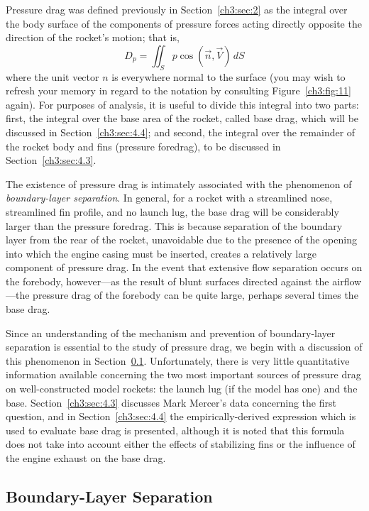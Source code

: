 Pressure drag was defined previously in Section~\ref{ch3:sec:2} as the
integral over the body surface of the components of pressure forces acting
directly opposite the direction of the rocket's motion; that is,
\begin{equation}\label{ch3:eq:109}
D_p = \iint_{S} p\cos(\vec{n},\vec{V})\,dS
\end{equation}
where the unit vector $n$ is everywhere normal to the surface (you may wish to
refresh your memory in regard to the notation by consulting
Figure~\ref{ch3:fig:11} again). For purposes of analysis, it is useful to
divide this integral into two parts: first, the integral over the base area of
the rocket, called base drag, which will be discussed in
Section~\ref{ch3:sec:4.4}; and second, the integral over the remainder of the
rocket body and fins (pressure foredrag), to be discussed in
Section~\ref{ch3:sec:4.3}.

The existence of pressure drag is intimately associated with the phenomenon of
\emph{boundary-layer separation}. In general, for a rocket with a streamlined
nose, streamlined fin profile, and no launch lug, the base drag will be
considerably larger than the pressure foredrag. This is because separation of
the boundary layer from the rear of the rocket, unavoidable due to the presence
of the opening into which the engine casing must be inserted, creates a
relatively large component of pressure drag. In the event that extensive flow
separation occurs on the forebody, however---as the result of blunt surfaces
directed against the airflow---the pressure drag of the forebody can be quite
large, perhaps several times the base drag.

Since an understanding of the mechanism and prevention of boundary-layer
separation is essential to the study of pressure drag, we begin with a
discussion of this phenomenon in Section~\ref{ch3:sec:4.2}. Unfortunately,
there is very little quantitative information available concerning the two most
important sources of pressure drag on well-constructed model rockets: the
launch lug (if the model has one) and the base. Section~\ref{ch3:sec:4.3}
discusses Mark Mercer's data concerning the first question, and in
Section~\ref{ch3:sec:4.4} the empirically-derived expression which is used to
evaluate base drag is presented, although it is noted that this formula does
not take into account either the effects of stabilizing fins or the influence
of the engine exhaust on the base drag.

\subsection{Boundary-Layer Separation}\label{ch3:sec:4.2}

